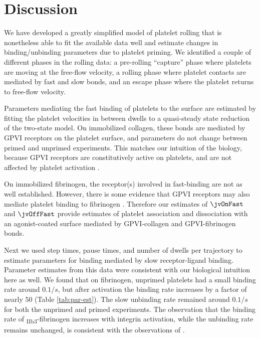 \section{Discussion}
\label{sec:discussion-jv}

We have developed a greatly simplified model of platelet rolling that
is nonetheless able to fit the available data well and estimate
changes in binding/unbinding parameters due to platelet
priming. We identified a couple of different phases in the rolling
data: a pre-rolling ``capture'' phase where platelets are moving at
the free-flow velocity, a rolling phase where platelet contacts are
mediated by fast and slow bonds, and an escape phase where the
platelet returns to free-flow velocity.

Parameters mediating the fast binding of platelets to the surface are
estimated by fitting the platelet velocities in between dwells to a
quasi-steady state reduction of the two-state model. On immobilized
collagen, these bonds are mediated by GPVI receptors on the platelet
surface, and parameters do not change between primed and unprimed
experiments. This matches our intuition of the biology, because GPVI
receptors are constitutively active on platelets, and are not affected
by platelet activation .

On immobilized fibrinogen, the receptor(s) involved in fast-binding are
not as well established. However, there is some evidence that GPVI
receptors may also mediate platelet binding to fibrinogen
. Therefore our estimates of $\jvOnFast$ and
$\jvOffFast$ provide estimates of platelet association and
dissociation with an agonist-coated surface mediated by GPVI-collagen
and GPVI-fibrinogen bonds.

Next we used step times, pause times, and number of dwells per
trajectory to estimate parameters for binding mediated by slow
receptor-ligand binding. Parameter estimates from this data were
consistent with our biological intuition here as well. We found that
on fibrinogen, unprimed platelets had a small binding rate around $0.1
/s$, but after activation the binding rate increases by a factor of
nearly $50$ (Table \ref{tab:par-est}). The slow unbinding rate
remained around $0.1 /s$ for both the unprimed and primed
experiments. The observation that the binding rate of
\textalpha\textsubscript{IIb}\textbeta\textsubscript{3}-fibrinogen
increases with integrin activation, while the unbinding rate remains
unchanged, is consistent with the observations of \cite{Litvinov2012}.

